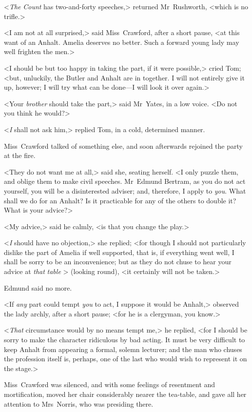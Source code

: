 <\textit{The}  \textit{Count}  has two-and-forty speeches,> returned Mr~Rushworth, <which is no trifle.>

<I am not at all surprised,> said Miss~Crawford, after a short pause, <at this want of an Anhalt. Amelia deserves no better. Such a forward young lady may well frighten the men.>

<I should be but too happy in taking the part, if it were possible,> cried Tom; <but, unluckily, the Butler and Anhalt are in together. I will not entirely give it up, however; I will try what can be done—I will look it over again.>

<Your \textit{brother}  should take the part,> said Mr~Yates, in a low voice. <Do not you think he would?>

<\textit{I}  shall not ask him,> replied Tom, in a cold, determined manner.

Miss~Crawford talked of something else, and soon afterwards rejoined the party at the fire.

<They do not want me at all,> said she, seating herself. <I only puzzle them, and oblige them to make civil speeches. Mr~Edmund Bertram, as you do not act yourself, you will be a disinterested adviser; and, therefore, I apply to \textit{you}. What shall we do for an Anhalt? Is it practicable for any of the others to double it? What is your advice?>

<My advice,> said he calmly, <is that you change the play.>

<\textit{I}  should have no objection,> she replied; <for though I should not particularly dislike the part of Amelia if well supported, that is, if everything went well, I shall be sorry to be an inconvenience; but as they do not chuse to hear your advice at \textit{that}  \textit{table} > (looking round), <it certainly will not be taken.>

Edmund said no more.

<If \textit{any}  part could tempt \textit{you}  to act, I suppose it would be Anhalt,> observed the lady archly, after a short pause; <for he is a clergyman, you know.>

<\textit{That}  circumstance would by no means tempt me,> he replied, <for I should be sorry to make the character ridiculous by bad acting. It must be very difficult to keep Anhalt from appearing a formal, solemn lecturer; and the man who chuses the profession itself is, perhaps, one of the last who would wish to represent it on the stage.>

Miss~Crawford was silenced, and with some feelings of resentment and mortification, moved her chair considerably nearer the tea-table, and gave all her attention to Mrs~Norris, who was presiding there.

